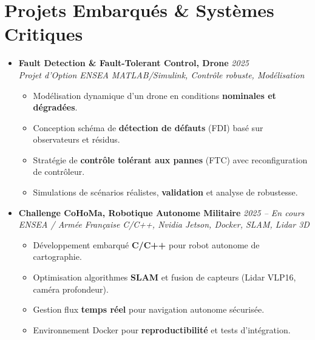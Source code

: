 \documentclass[a4paper,11pt]{article}
\begin{document}
\section{Projets Embarqués \& Systèmes Critiques}
\begin{itemize}[leftmargin=*, label={-}]

\item \textbf{Fault Detection \& Fault-Tolerant Control, Drone} \hfill \textit{2025} \\
\textit{Projet d'Option ENSEA} \hfill \textit{MATLAB/Simulink, Contrôle robuste, Modélisation}
\vspace{-2pt}
    \begin{itemize}[leftmargin=0.4cm, nosep, label=\tiny$\bullet$]
        \item \small{Modélisation dynamique d'un drone en conditions \textbf{nominales et dégradées}.}
        \item \small{Conception schéma de \textbf{détection de défauts} (FDI) basé sur observateurs et résidus.}
        \item \small{Stratégie de \textbf{contrôle tolérant aux pannes} (FTC) avec reconfiguration de contrôleur.}
        \item \small{Simulations de scénarios réalistes, \textbf{validation} et analyse de robustesse.}
    \end{itemize}
\vspace{3pt}

\item \textbf{Challenge CoHoMa, Robotique Autonome Militaire} \hfill \textit{2025 -- En cours} \\
\textit{ENSEA / Armée Française} \hfill \textit{C/C++, Nvidia Jetson, Docker, SLAM, Lidar 3D}
\vspace{-2pt}
    \begin{itemize}[leftmargin=0.4cm, nosep, label=\tiny$\bullet$]
        \item \small{Développement embarqué \textbf{C/C++} pour robot autonome de cartographie.}
        \item \small{Optimisation algorithmes \textbf{SLAM} et fusion de capteurs (Lidar VLP16, caméra profondeur).}
        \item \small{Gestion flux \textbf{temps réel} pour navigation autonome sécurisée.}
        \item \small{Environnement Docker pour \textbf{reproductibilité} et tests d'intégration.}
    \end{itemize}
\vspace{3pt}


\end{itemize}
\end{document}
